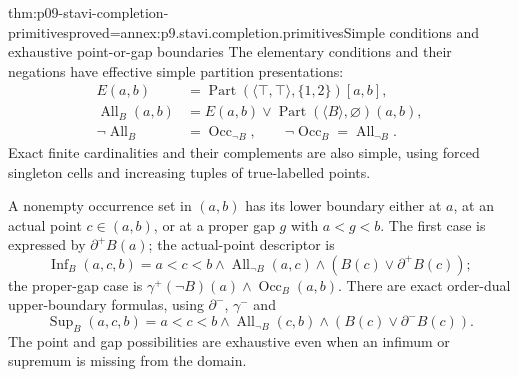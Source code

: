 \begin{hblemma}{thm:p09-stavi-completion-primitives}{proved=annex:p9.stavi.completion.primitives}{Simple conditions and exhaustive point-or-gap boundaries}
The elementary conditions and their negations have
effective simple partition presentations:
\[
\begin{aligned}
 E(a,b)&=\operatorname{Part}(\langle\top,\top\rangle,\{1,2\})[a,b],\\
 \operatorname{All}_B(a,b)&=
       E(a,b)\lor\operatorname{Part}(\langle B\rangle,\varnothing)(a,b),\\
 \neg\operatorname{All}_B&=\operatorname{Occ}_{\neg B},\qquad
 \neg\operatorname{Occ}_B=\operatorname{All}_{\neg B}.
\end{aligned}
\]
Exact finite cardinalities and their complements are
also simple, using forced singleton cells and increasing
tuples of true-labelled points.

A nonempty occurrence set in \((a,b)\) has its lower
boundary either at \(a\), at an actual point \(c\in(a,b)\),
or at a proper gap \(g\) with \(a<g<b\).
The first case is expressed by \(\partial^+B(a)\);
the actual-point descriptor is
\[
 \operatorname{Inf}_B(a,c,b)=
     a<c<b\land\operatorname{All}_{\neg B}(a,c)
                          \land(B(c)\lor\partial^+B(c));
\]
the proper-gap case is
\(\gamma^+(\neg B)(a)\land\operatorname{Occ}_B(a,b)\).
There are exact order-dual upper-boundary formulas,
using \(\partial^-\), \(\gamma^-\) and
\[
 \operatorname{Sup}_B(a,c,b)=
     a<c<b\land\operatorname{All}_{\neg B}(c,b)
                          \land(B(c)\lor\partial^-B(c)).
\]
The point and gap possibilities are exhaustive
even when an infimum or supremum is missing from
the domain.
\end{hblemma}

